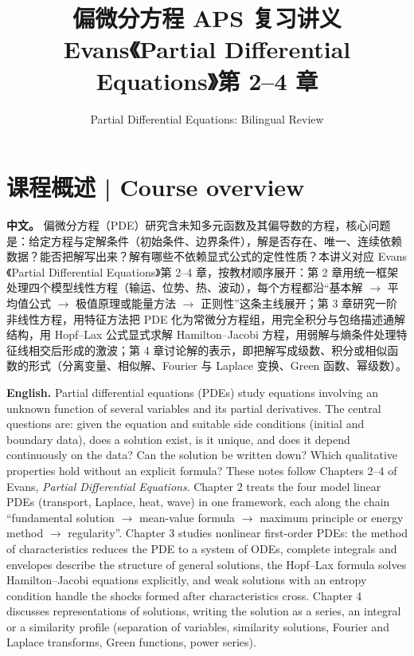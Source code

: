 \documentclass[UTF8,11pt,a4paper]{ctexart}
\title{偏微分方程 APS 复习讲义\\[4pt]\large Evans《Partial Differential Equations》第 2--4 章}
\author{Partial Differential Equations: Bilingual Review}
\date{}
\newcommand{\APS}[2]{\par\noindent\textbf{中文。} #1\par\noindent\textbf{English.} #2\par\smallskip}
\begin{document}
\maketitle

\section*{课程概述 | Course overview}
\APS{偏微分方程（PDE）研究含未知多元函数及其偏导数的方程，核心问题是：给定方程与定解条件（初始条件、边界条件），解是否存在、唯一、连续依赖数据？能否把解写出来？解有哪些不依赖显式公式的定性性质？本讲义对应 Evans《Partial Differential Equations》第 2--4 章，按教材顺序展开：第 2 章用统一框架处理四个模型线性方程（输运、位势、热、波动），每个方程都沿``基本解 $\to$ 平均值公式 $\to$ 极值原理或能量方法 $\to$ 正则性''这条主线展开；第 3 章研究一阶非线性方程，用特征方法把 PDE 化为常微分方程组，用完全积分与包络描述通解结构，用 Hopf--Lax 公式显式求解 Hamilton--Jacobi 方程，用弱解与熵条件处理特征线相交后形成的激波；第 4 章讨论解的表示，即把解写成级数、积分或相似函数的形式（分离变量、相似解、Fourier 与 Laplace 变换、Green 函数、幂级数）。}{Partial differential equations (PDEs) study equations involving an unknown function of several variables and its partial derivatives. The central questions are: given the equation and suitable side conditions (initial and boundary data), does a solution exist, is it unique, and does it depend continuously on the data? Can the solution be written down? Which qualitative properties hold without an explicit formula? These notes follow Chapters 2--4 of Evans, \emph{Partial Differential Equations}. Chapter 2 treats the four model linear PDEs (transport, Laplace, heat, wave) in one framework, each along the chain ``fundamental solution $\to$ mean-value formula $\to$ maximum principle or energy method $\to$ regularity''. Chapter 3 studies nonlinear first-order PDEs: the method of characteristics reduces the PDE to a system of ODEs, complete integrals and envelopes describe the structure of general solutions, the Hopf--Lax formula solves Hamilton--Jacobi equations explicitly, and weak solutions with an entropy condition handle the shocks formed after characteristics cross. Chapter 4 discusses representations of solutions, writing the solution as a series, an integral or a similarity profile (separation of variables, similarity solutions, Fourier and Laplace transforms, Green functions, power series).}
\end{document}
